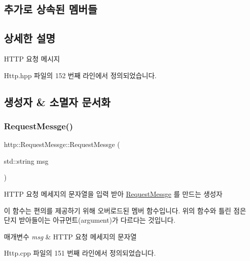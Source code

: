 \subsection*{추가로 상속된 멤버들}


\subsection{상세한 설명}
H\+T\+TP 요청 메시지 

Http.\+hpp 파일의 152 번째 라인에서 정의되었습니다.



\subsection{생성자 \& 소멸자 문서화}
\mbox{\label{classhttp_1_1_request_messge_aa79dcaf03eb6c49010e5df0c75fb3740}} 
\subsubsection{\texorpdfstring{Request\+Messge()}{RequestMessge()}\hspace{0.1cm}{\footnotesize\ttfamily [1/2]}}
{\footnotesize\ttfamily http\+::\+Request\+Messge\+::\+Request\+Messge (\begin{DoxyParamCaption}\item[{std\+::string}]{msg }\end{DoxyParamCaption})}



H\+T\+TP 요청 메세지의 문자열을 입력 받아 \hyperlink{classhttp_1_1_request_messge}{Request\+Messge} 를 만드는 생성자 

이 함수는 편의를 제공하기 위해 오버로드된 멤버 함수입니다. 위의 함수와 틀린 점은 단지 받아들이는 아규먼트(argument)가 다르다는 것입니다. 
\begin{DoxyParams}{매개변수}
{\em msg} & H\+T\+TP 요청 메세지의 문자열 \\
\hline
\end{DoxyParams}


Http.\+cpp 파일의 151 번째 라인에서 정의되었습니다.

\mbox{\label{classhttp_1_1_request_messge_a8b9e3bc54bc34d1ec19cf4253057444b}} 
